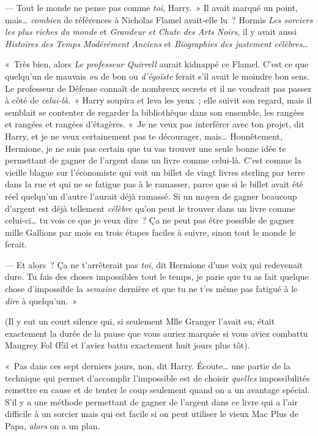 --- Tout le monde ne pense pas comme \emph{toi}, Harry.~» Il avait marqué un point, mais… \emph{combien} de références à Nicholas Flamel avait-elle lu~? Hormis \emph{Les sorciers les plus riches du monde} et \emph{Grandeur et Chute des Arts Noirs}, il y avait aussi \emph{Histoires des Temps Modérément Anciens} et \emph{Biographies des justement célèbres}…

«~Très bien, alors \emph{Le professeur Quirrell} aurait kidnappé ce Flamel. C'est ce que quelqu'un de mauvais \emph{ou} de bon ou \emph{d'égoïste} ferait s'il avait le moindre bon sens. Le professeur de Défense connaît de nombreux secrets et il ne voudrait pas passer à côté de \emph{celui-là}.~» Harry soupira et leva les yeux~; elle suivit son regard, mais il semblait se contenter de regarder la bibliothèque dans son ensemble, les rangées et rangées et rangées d'étagères. «~Je ne veux pas interférer avec ton projet, dit Harry, et je ne veux certainement pas te décourager, mais… Honnêtement, Hermione, je ne suis pas certain que tu vas trouver une seule bonne idée te permettant de gagner de l'argent dans un livre comme celui-là. C'est comme la vieille blague sur l'économiste qui voit un billet de vingt livres sterling par terre dans la rue et qui ne se fatigue pas à le ramasser, parce que si le billet avait été réel quelqu'un d'autre l'aurait déjà ramassé. Si un moyen de gagner beaucoup d'argent est déjà tellement \emph{célèbre} qu'on peut le trouver dans un livre comme celui-ci… tu vois ce que je veux dire~? Ça ne peut pas être possible de gagner mille Gallions par mois en trois étapes faciles à suivre, sinon tout le monde le ferait.

--- Et alors~? Ça ne t'arrêterait pas \emph{toi}, dit Hermione d'une voix qui redevenait dure. Tu fais des choses impossibles tout le temps, je parie que tu as fait quelque chose d'impossible la \emph{semaine} dernière et que tu ne t'es même pas fatigué à le \emph{dire} à quelqu'un.~»

(Il y eut un court silence qui, si seulement Mlle Granger l'avait su, était exactement la durée de la pause que vous auriez marquée si vous aviez combattu Maugrey Fol Œil et l'aviez battu exactement huit jours plus tôt).

«~Pas dans ces sept derniers jours, non, dit Harry. Écoute… une partie de la technique qui permet d'accomplir l'impossible est de choisir \emph{quelles} impossibilités remettre en cause et de tenter le coup seulement quand on a un avantage spécial. S'il y a une méthode permettant de gagner de l'argent dans ce livre qui a l'air difficile à un sorcier mais qui est facile si on peut utiliser le vieux Mac Plus de Papa, \emph{alors} on a un plan.

